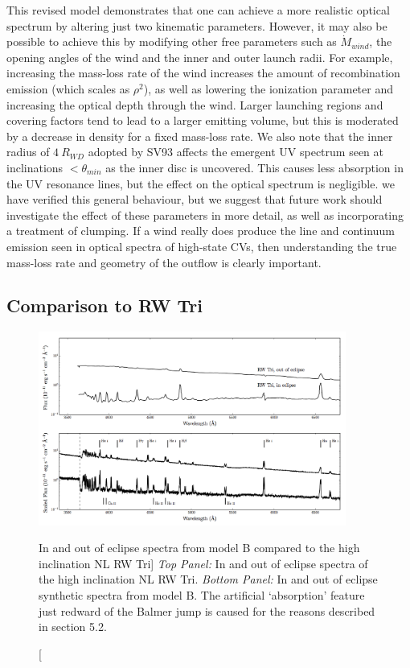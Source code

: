This revised model demonstrates that one can achieve a more
realistic optical spectrum by altering just two kinematic parameters. 
However, it may also be possible to achieve this by modifying
other free parameters such as $\dot{M}_{wind}$, the opening angles of the wind and the 
inner and outer launch radii. For example, increasing the mass-loss rate of the wind
increases the amount of recombination emission (which scales as $\rho^2$), 
as well as lowering the ionization parameter and increasing the optical depth through the wind. 
Larger launching regions and covering factors tend to lead to a larger emitting volume, 
but this is moderated by a decrease in density 
for a fixed mass-loss rate. We also note that the inner radius of $4~R_{WD}$ adopted by SV93 
affects the emergent UV spectrum seen at inclinations $<\theta_{min}$ as 
the inner disc is uncovered. This causes less absorption in the UV resonance lines,
but the effect on the optical spectrum is negligible.
we have verified this general behaviour, but
we suggest that future work should investigate the effect of these parameters in more detail,
as well as incorporating a treatment of clumping.
If a wind really does produce the line and continuum emission seen in optical spectra of high-state CVs, then
understanding the true mass-loss rate and geometry of the outflow is clearly important.


\subsection{Comparison to RW Tri}

\begin{figure}
\includegraphics[width=0.9\textwidth]{figures/05-cvpaper/fig13.png}
\caption
[In and out of eclipse spectra from model B compared to the high
inclination NL RW Tri]
{{\sl Top Panel:} In and out of eclipse spectra of the high
inclination NL RW Tri. {\sl Bottom Panel:} In and out of eclipse synthetic
spectra from model B.
The artificial `absorption' feature just redward of the Balmer jump
is caused for the reasons described in section 5.2.}
\label{rwtricomp}
\end{figure}


